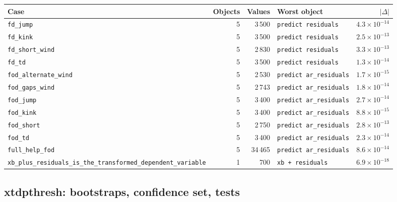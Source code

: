 \documentclass[10.5pt,a4paper]{article}
\begin{document}
\begin{longtable}{@{}p{3.6cm}rrp{4.9cm}r@{}}
\toprule
Case & Objects & Values & Worst object & $|\Delta|$ \\
\midrule
\endhead
\texttt{fd\_\allowbreak{}jump} & 5 & 3\,500 & \texttt{predict residuals} & $4.3\times10^{-14}$ \\
\texttt{fd\_\allowbreak{}kink} & 5 & 3\,500 & \texttt{predict residuals} & $2.5\times10^{-13}$ \\
\texttt{fd\_\allowbreak{}short\_\allowbreak{}wind} & 5 & 2\,830 & \texttt{predict residuals} & $3.3\times10^{-13}$ \\
\texttt{fd\_\allowbreak{}td} & 5 & 3\,500 & \texttt{predict residuals} & $1.3\times10^{-14}$ \\
\texttt{fod\_\allowbreak{}alternate\_\allowbreak{}wind} & 5 & 2\,530 & \texttt{predict ar\_\allowbreak{}residuals} & $1.7\times10^{-15}$ \\
\texttt{fod\_\allowbreak{}gaps\_\allowbreak{}wind} & 5 & 2\,743 & \texttt{predict ar\_\allowbreak{}residuals} & $1.8\times10^{-14}$ \\
\texttt{fod\_\allowbreak{}jump} & 5 & 3\,400 & \texttt{predict ar\_\allowbreak{}residuals} & $2.7\times10^{-14}$ \\
\texttt{fod\_\allowbreak{}kink} & 5 & 3\,400 & \texttt{predict ar\_\allowbreak{}residuals} & $8.8\times10^{-15}$ \\
\texttt{fod\_\allowbreak{}short} & 5 & 2\,750 & \texttt{predict ar\_\allowbreak{}residuals} & $2.8\times10^{-13}$ \\
\texttt{fod\_\allowbreak{}td} & 5 & 3\,400 & \texttt{predict ar\_\allowbreak{}residuals} & $2.3\times10^{-14}$ \\
\texttt{full\_\allowbreak{}help\_\allowbreak{}fod} & 5 & 34\,465 & \texttt{predict ar\_\allowbreak{}residuals} & $8.6\times10^{-14}$ \\
\texttt{xb\_\allowbreak{}plus\_\allowbreak{}residuals\_\allowbreak{}is\_\allowbreak{}the\_\allowbreak{}transformed\_\allowbreak{}dependent\_\allowbreak{}variable} & 1 & 700 & \texttt{xb + residuals} & $6.9\times10^{-18}$ \\
\bottomrule
\end{longtable}

\subsection*{xtdpthresh: bootstraps, confidence set, tests}
\end{document}
